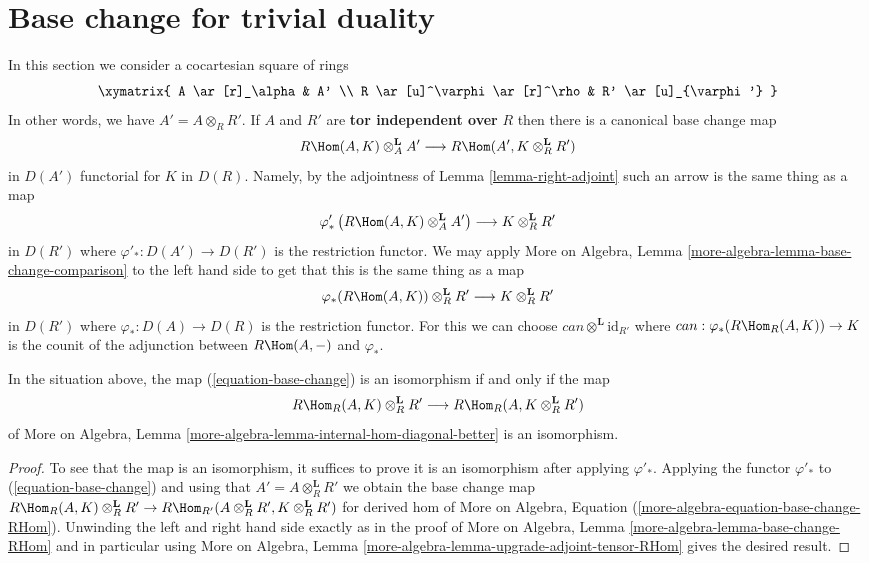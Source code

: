 \section{Base change for trivial duality}
\label{section-base-change-trivial-duality}

\noindent
In this section we consider a cocartesian square of rings
$$
\xymatrix{
A \ar[r]_\alpha & A' \\
R \ar[u]^\varphi \ar[r]^\rho & R' \ar[u]_{\varphi'}
}
$$
In other words, we have $A' = A \otimes_R R'$. If $A$ and $R'$
are {\bf tor independent over} $R$ then there is a canonical base change map
\begin{equation}
\label{equation-base-change}
R\Hom(A, K) \otimes_A^\mathbf{L} A'
\longrightarrow
R\Hom(A', K \otimes_R^\mathbf{L} R')
\end{equation}
in $D(A')$ functorial for $K$ in $D(R)$. Namely, by the adjointness
of Lemma \ref{lemma-right-adjoint} such an arrow is the same thing as a map
$$
\varphi'_*\left(R\Hom(A, K) \otimes_A^\mathbf{L} A'\right)
\longrightarrow
K \otimes_R^\mathbf{L} R'
$$
in $D(R')$ where $\varphi'_* : D(A') \to D(R')$ is the restriction functor.
We may apply
More on Algebra, Lemma \ref{more-algebra-lemma-base-change-comparison}
to the left hand side to get that this is the same thing as a map
$$
\varphi_*(R\Hom(A, K)) \otimes_R^\mathbf{L} R'
\longrightarrow
K \otimes_R^\mathbf{L} R'
$$
in $D(R')$ where $\varphi_* : D(A) \to D(R)$ is the restriction functor.
For this we can choose $can \otimes^\mathbf{L} \text{id}_{R'}$
where $can : \varphi_*(R\Hom_R(A, K)) \to K$ is the
counit of the adjunction between $R\Hom(A, -)$ and $\varphi_*$.

\begin{lemma}
\label{lemma-check-base-change-is-iso}
In the situation above, the map (\ref{equation-base-change})
is an isomorphism if and only if the map
$$
R\Hom_R(A, K) \otimes_R^\mathbf{L} R'
\longrightarrow
R\Hom_R(A, K \otimes_R^\mathbf{L} R')
$$
of More on Algebra, Lemma
\ref{more-algebra-lemma-internal-hom-diagonal-better} is an isomorphism.
\end{lemma}

\begin{proof}
To see that the map is an isomorphism, it suffices to prove it
is an isomorphism after applying $\varphi'_*$.
Applying the functor $\varphi'_*$ to (\ref{equation-base-change})
and using that $A' = A \otimes_R^\mathbf{L} R'$
we obtain the base change map
$R\Hom_R(A, K) \otimes_R^\mathbf{L} R' \to
R\Hom_{R'}(A \otimes_R^\mathbf{L} R', K \otimes_R^\mathbf{L} R')$
for derived hom of
More on Algebra, Equation (\ref{more-algebra-equation-base-change-RHom}).
Unwinding the left and right hand side exactly as in the proof of
More on Algebra, Lemma \ref{more-algebra-lemma-base-change-RHom}
and in particular using
More on Algebra, Lemma \ref{more-algebra-lemma-upgrade-adjoint-tensor-RHom}
gives the desired result.
\end{proof}


